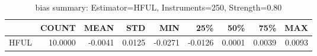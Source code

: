 \begin{table}[ht]
\centering
\caption{bias summary: Estimator=HFUL, Instruments=250, Strength=0.80}
\begin{tabular}{lrrrrrrrr}
\toprule
 & COUNT & MEAN & STD & MIN & 25\% & 50\% & 75\% & MAX \\
\midrule
HFUL & 10.0000 & -0.0041 & 0.0125 & -0.0271 & -0.0126 & 0.0001 & 0.0039 & 0.0093 \\
\bottomrule
\end{tabular}
\end{table}
